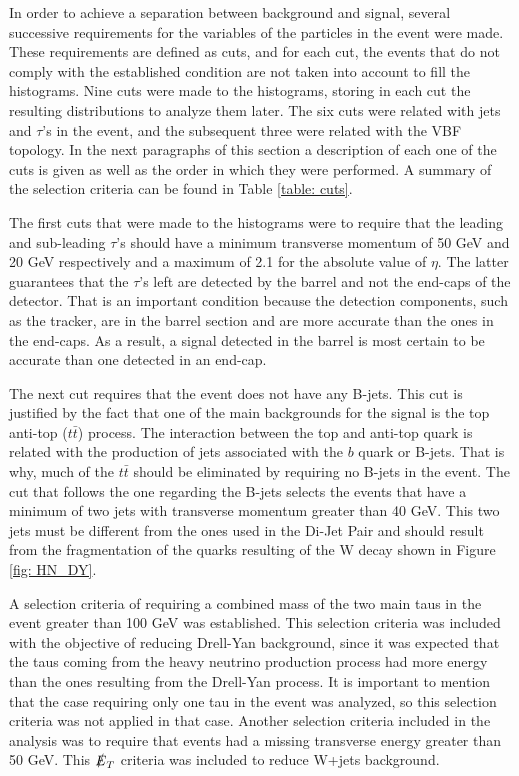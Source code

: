 In order to achieve a separation between background and signal, several successive requirements for the variables of the particles in the event were made. These requirements are defined as cuts, and for each cut, the events that do not comply with the established condition are not taken into account to fill the histograms. Nine cuts were made to the histograms, storing in each cut the resulting distributions to analyze them later. The six cuts were related with jets and $\tau$'s in the event, and the subsequent three were related with the VBF topology. In the next paragraphs of this section a description of each one of the cuts is given as well as the order in which they were performed. A summary of the selection criteria can be found in Table \ref{table: cuts}.

The first cuts that were made to the histograms were to require that the leading and sub-leading $\tau$'s should have a minimum transverse momentum of 50 GeV and 20 GeV respectively and a maximum of 2.1 for the absolute value of $\eta$. The latter guarantees that the $\tau$'s left are detected by the barrel and not the end-caps of the detector. That is an important condition because the detection components, such as the tracker, are in the barrel section and are more accurate than the ones in the end-caps. As a result, a signal detected in the barrel is most certain to be accurate than one detected in an end-cap.  

The next cut requires that the event does not have any B-jets. This cut is justified by the fact that one of the main backgrounds for the signal is the top anti-top ($t\bar{t}$) process. The interaction between the top and anti-top quark is related with the production of jets associated with the $b$ quark or B-jets. That is why, much of the $t\bar{t}$ should be eliminated by requiring no B-jets in the event. The cut that follows the one regarding the B-jets selects the events that have a minimum of two jets with transverse momentum greater than 40 GeV. This two jets must be different from the ones used in the Di-Jet Pair and should result from the fragmentation of the quarks resulting of the W decay shown in Figure \ref{fig: HN_DY}.

A selection criteria of requiring a combined mass of the two main taus in the event greater than 100 GeV was established. This selection criteria was included with the objective of reducing Drell-Yan background, since it was expected that the taus coming from the heavy neutrino production process had more energy than the ones resulting from the Drell-Yan process. It is important to mention that the case requiring only one tau in the event was analyzed, so this selection criteria was not applied in that case. Another selection criteria included in the analysis was to require that events had a missing transverse energy greater than 50 GeV. This $\slashed{E}_{T}$ criteria was included to reduce W+jets background.

